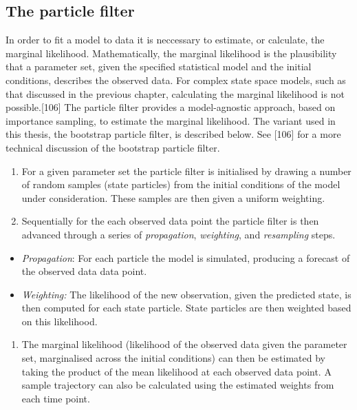 \documentclass[11pt,twoside]{bristolthesis}
\providecommand{\tightlist}{%
  \setlength{\itemsep}{0pt}\setlength{\parskip}{0pt}}
\begin{document}
  \hypertarget{particle-filter}{%
  \subsection{The particle filter}\label{particle-filter}}
  
  In order to fit a model to data it is neccessary to estimate, or calculate, the marginal likelihood. Mathematically, the marginal likelihood is the plausibility that a parameter set, given the specified statistical model and the initial conditions, describes the observed data. For complex state space models, such as that discussed in the previous chapter, calculating the marginal likelihood is not possible.{[}106{]} The particle filter provides a model-agnostic approach, based on importance sampling, to estimate the marginal likelihood. The variant used in this thesis, the bootstrap particle filter, is described below. See {[}106{]} for a more technical discussion of the bootstrap particle filter.
  \begin{enumerate}
  \def\labelenumi{\arabic{enumi}.}
  \item
    For a given parameter set the particle filter is initialised by drawing a number of random samples (state particles) from the initial conditions of the model under consideration. These samples are then given a uniform weighting.
  \item
    Sequentially for the each observed data point the particle filter is then advanced through a series of \emph{propagation}, \emph{weighting}, and \emph{resampling} steps.
  \end{enumerate}
  \begin{itemize}
  \item
    \emph{Propagation}: For each particle the model is simulated, producing a forecast of the observed data data point.
  \item
    \emph{Weighting:} The likelihood of the new observation, given the predicted state, is then computed for each state particle. State particles are then weighted based on this likelihood.
  \end{itemize}
  \begin{enumerate}
  \def\labelenumi{\arabic{enumi}.}
  \setcounter{enumi}{2}
  \tightlist
  \item
    The marginal likelihood (likelihood of the observed data given the parameter set, marginalised across the initial conditions) can then be estimated by taking the product of the mean likelihood at each observed data point. A sample trajectory can also be calculated using the estimated weights from each time point.
  \end{enumerate}
\end{document}
